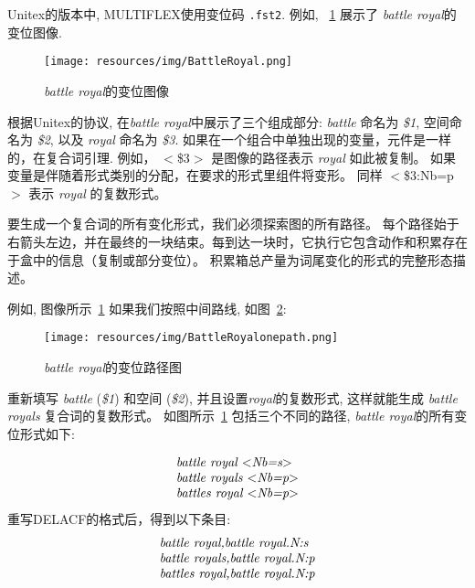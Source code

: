 \bigskip
\noindent Unitex的版本中, MULTIFLEX使用变位码 \verb+.fst2+. 例如, ~\ref{fig:BattleRoyal} 展示了 \emph{battle royal}的变位图像.

\begin{figure}[!htb]
  \centering
  \texttt{[image: resources/img/BattleRoyal.png]}
  \caption{\emph{battle royal}的变位图像}
  \label{fig:BattleRoyal}
\end{figure}

\bigskip
\noindent 根据Unitex的协议, 在\emph{battle royal}中展示了三个组成部分:
\emph{battle} 命名为 \emph{\$1}, 空间命名为 \emph{\$2}, 以及 \emph{royal} 命名为 \emph{\$3}.
如果在一个组合中单独出现的变量，元件是一样的，在复合词引理. 例如， $<$\$3$>$ 是图像的路径表示 \emph{royal}
如此被复制。 如果变量是伴随着形式类别的分配，在要求的形式里组件将变形。
同样 $<$\$3:Nb=p$>$ 表示 \emph{royal} 的复数形式。

\bigskip
\noindent 要生成一个复合词的所有变化形式，我们必须探索图的所有路径。
每个路径始于右箭头左边，并在最终的一块结束。每到达一块时，它执行它包含动作和积累存在于盒中的信息（复制或部分变位）。
积累箱总产量为词尾变化的形式的完整形态描述。

\bigskip
\noindent 例如, 图像所示~\ref{fig:BattleRoyal} 如果我们按照中间路线, 如图~\ref{fig:BattleRoyalonepath}:

\begin{figure}[!htb]
  \centering
  \texttt{[image: resources/img/BattleRoyalonepath.png]}
  \caption{\emph{battle royal}的变位路径图}
  \label{fig:BattleRoyalonepath}
\end{figure}

\bigskip
\noindent 重新填写 \emph{battle} (\emph{\$1}) 和空间 (\emph{\$2}), 并且设置\emph{royal}的复数形式, 这样就能生成 \emph{battle royals} 复合词的复数形式。 如图所示~\ref{fig:BattleRoyal} 包括三个不同的路径, \emph{battle royal}的所有变位形式如下: 

\[
\begin{array}[l]{l}
\emph{battle royal $<$Nb=s$>$} \\
\emph{battle royals $<$Nb=p$>$} \\
\emph{battles royal $<$Nb=p$>$}
\end{array}
\]
\bigskip
\noindent 重写DELACF的格式后，得到以下条目:
\[
\begin{array}[l]{l}
\emph{battle royal,battle royal.N:s} \\
\emph{battle royals,battle royal.N:p} \\
\emph{battles royal,battle royal.N:p}
\end{array}
\]

